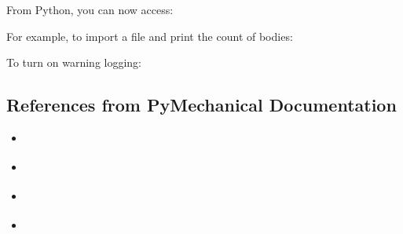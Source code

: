 \documentclass[9pt,landscape]{article}
\begin{document}
\begin{multicols}{3}
From Python, you can now access: 
 


For example, to import a file and print the count of bodies:


To turn on warning logging:


\subsection{References from PyMechanical Documentation}
\begin{multicols}{2}
\begin{itemize}
    \item \href{https://mechanical.docs.pyansys.com/version/stable/getting_started/index.html}{\color{blue}{Getting Started}}
    \item \href{https://mechanical.docs.pyansys.com/version/stable/examples/index.html}{\color{blue}{Examples}}
    \item \href{https://mechanical.docs.pyansys.com/version/stable/api/index.html}{\color{blue}{API Reference}}
    \item \href{https://ansyshelp.ansys.com/account/secured?returnurl=/Views/Secured/corp/v231/en/act_script/act_script.html}{\color{blue}{Scripting in Mechanical}}
\end{itemize}
\end{multicols}
\end{multicols}
\end{document}

